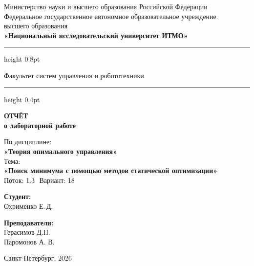 \documentclass[a4paper,12pt]{article}
\begin{document}
	
	\begin{titlepage}
		\centering
		
		\vspace*{0.5cm}
		{\small
			Министерство науки и высшего образования Российской Федерации\\[2pt]
			Федеральное государственное автономное образовательное учреждение\\
			высшего образования\\[2pt]
			\textbf{«Национальный исследовательский университет ИТМО»}\\
		}
		
		\vspace{0.8cm}
		\hrule height 0.8pt
		\vspace{0.3cm}
		
		{\large Факультет систем управления и робототехники}
		
		\vspace{0.3cm}
		\hrule height 0.4pt
		\vspace{2.5cm}
		
		{\Huge\bfseries ОТЧЁТ}\\[0.4cm]
		{\LARGE\bfseries о лабораторной работе}\\[0.8cm]
		
		\begin{tcolorbox}[
			colback=gray!4,
			colframe=gray!10,
			boxrule=0.8pt,
			arc=4pt,
			left=12pt, right=12pt, top=8pt, bottom=8pt
			]
			\centering
			{\large По дисциплине:\\[4pt]}
			{\large\bfseries «Теория опимального управления»}\\[10pt]
			{\large Тема:\\[4pt]}
			{\large\bfseries «Поиск минимума с помощью методов статической оптимизации»} \\[10pt]
			{\large Поток: 1.3 \( \) Вариант: 18}
		\end{tcolorbox}
		
		\vspace{3cm}
		
		\begin{minipage}{0.45\textwidth}
			\raggedright
			{\large\bfseries Студент:}\\[4pt]
			Охрименко Е.\,Д.\\
		\end{minipage}
		\hfill
		\begin{minipage}{0.45\textwidth}
			\raggedleft
			{\large\bfseries Преподаватели:}\\[4pt]
			Герасимов Д.Н.\\
			Паромонов А. В.
		\end{minipage}
		
		\vfill
		\vspace{0.4cm}
		{\large Санкт-Петербург, 2026}
	\end{titlepage}
	
\end{document}
